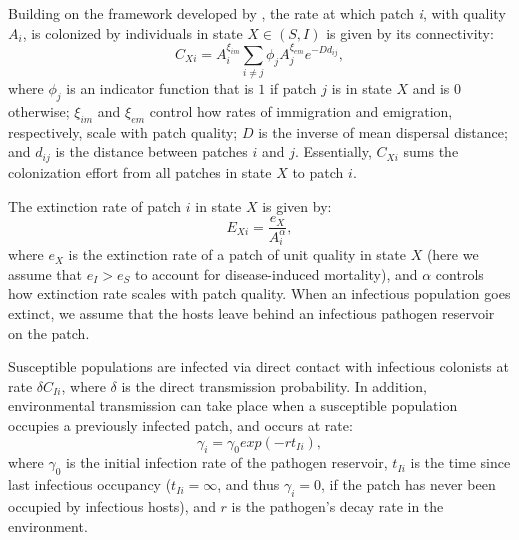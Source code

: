 \documentclass{svjour3}
\begin{document}
Building on the framework developed by \cite{Hanski2003}, the rate at which patch \emph{i}, with quality $A_i$, is colonized by individuals in state $X \in (S,I)$ is given by its connectivity:
\begin{equation}
C_{Xi}=A_i^{\xi_{im}} \sum_{i\neq j }\phi_jA_j^{\xi_{em}}e^{-D d_{ij}},
\label{connectivity}
\end{equation}
where $\phi_j$ is an indicator function that is $1$ if patch $j$ is in state $X$ and is $0$ otherwise; $\xi_{im}$ and $\xi_{em}$ control how rates of immigration and emigration, respectively, scale with patch quality; $D$ is the inverse of mean dispersal distance; and $d_{ij}$ is the distance between patches $i$ and $j$.  Essentially, $C_{Xi}$ sums the colonization effort from all patches in state $X$ to patch $i$.  

The extinction rate of patch $i$ in state $X$ is given by:
\begin{equation}
E_{Xi}=\frac{e_X}{A_i^\alpha},
\end{equation}
where $e_X$ is the extinction rate of a patch of unit quality in state $X$ (here we assume that $e_I>e_S$ to account for disease-induced mortality), and $\alpha$ controls how extinction rate scales with patch quality.  When an infectious population goes extinct, we assume that the hosts leave behind an infectious pathogen reservoir on the patch.  

Susceptible populations are infected via direct contact with infectious colonists at rate $\delta C_{Ii}$, where $\delta$ is the direct transmission probability.  In addition, environmental transmission can take place when a susceptible population occupies a previously infected patch, and occurs at rate:
\begin{equation}
\gamma_i=\gamma_0exp(-rt_{Ii}),
\end{equation}
where $\gamma_0$ is the initial infection rate of the pathogen reservoir, $t_{Ii}$ is the time since last infectious occupancy ($t_{Ii} = \infty$, and thus $\gamma_i = 0$, if the patch has never been occupied by infectious hosts), and $r$ is the pathogen's decay rate in the environment.
\end{document}
